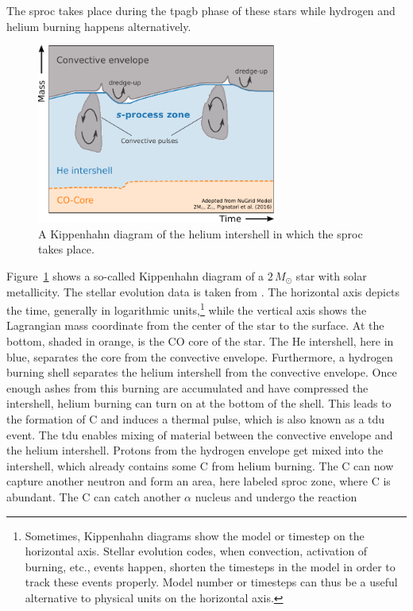 The \ac{sproc} takes place during the \ac{tpagb} phase of these stars while hydrogen and helium burning happens alternatively. 
\begin{figure}[tb]
    \centering
    \includegraphics[width=0.7\textwidth]{graphics/s-process/kippenhahn_s-process}
    \caption{A Kippenhahn diagram of the helium intershell in which the \ac{sproc} takes place.}
    \label{fig:s-process:kippenhahn_s-process}
\end{figure}
Figure~\ref{fig:s-process:kippenhahn_s-process} shows a so-called Kippenhahn diagram of a $2\,M_\odot$ star with solar metallicity. The stellar evolution data is taken from \citet{pignatari16}. The horizontal axis depicts the time, generally in logarithmic units,\footnote{Sometimes, Kippenhahn diagrams show the model or timestep on the horizontal axis. Stellar evolution codes, when convection, activation of burning, etc., events happen, shorten the timesteps in the model in order to track these events properly. Model number or timesteps can thus be a useful alternative to physical units on the horizontal axis.} while the vertical axis shows the Lagrangian mass coordinate from the center of the star to the surface. At the bottom, shaded in orange, is the CO core of the star. The He intershell, here in blue, separates the core from the convective envelope. Furthermore, a hydrogen burning shell separates the helium intershell from the convective envelope. Once enough ashes from this burning are accumulated and have compressed the intershell, helium burning can turn on at the bottom of the shell. This leads to the formation of C and induces a thermal pulse, which is also known as a \acf{tdu} event. The \ac{tdu} enables mixing of material between the convective envelope and the helium intershell. 
Protons from the hydrogen envelope get mixed into the intershell, which already contains some C from helium burning. The C can now capture another neutron and form an area, here labeled \ac{sproc} zone, where C is abundant. The C can catch another $\alpha$ nucleus and undergo the reaction
